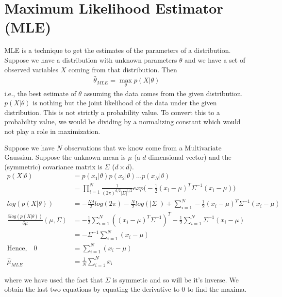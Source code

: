 \documentclass[../../statistical_learning_notes.tex]{subfiles}
\begin{document}
\section{Maximum Likelihood Estimator (MLE)}
MLE is a technique to get the estimates of the parameters of a distribution. Suppose we have a distribution with unknown parameters $\theta$ and we have a set of observed variables $X$ coming from that distribution. Then
\begin{align*}
    \hat{\theta}_{MLE} = \max_{\theta}p(X|\theta)
\end{align*}
i.e., the best estimate of $\theta$ assuming the data comes from the given distribution. $p(X|\theta)$ is nothing but the joint likelihood of the data under the given distribution. This is not strictly a probability value. To convert this to a probability value, we would be dividing by a normalizing constant which would not play a role in maximization.\newline

Suppose we have $N$ observations that we know come from a Multivariate Gaussian. Suppose the unknown mean is $\mu$ (a $d$ dimensional vector) and the (symmetric) covariance matrix is $\Sigma$ ($d \times d$).
\begin{align*}
    p(X|\theta) &= p(x_{1}|\theta)p(x_{2}|\theta) \ldots p(x_{N}|\theta)\\
    &= \prod_{i=1}^{N}\frac{1}{(2\pi)^{d/2} \lvert \Sigma \rvert^{1/2}} exp \bigg(-\frac{1}{2}(x_{i} - \mu)^{T}\Sigma^{-1}(x_{i} - \mu) \bigg)\\
    log(p(X|\theta)) &= -\frac{Nd}{2}log(2\pi) - \frac{N}{2}log(\lvert \Sigma \rvert) + \sum_{i=1}^{N}-\frac{1}{2}(x_{i} - \mu)^{T}\Sigma^{-1}(x_{i} - \mu)\\
    \frac{\partial log(p(X|\theta))}{\partial \mu}(\mu, \Sigma) &= -\frac{1}{2}\sum_{i=1}^{N} ((x_{i} - \mu)^{T}\Sigma^{-1})^{T} - \frac{1}{2}\sum_{i=1}^{N} \Sigma^{-1}(x_{i} - \mu)\\
    &= -\Sigma^{-1}\sum_{i=1}^{N} (x_{i} - \mu)\\
    \text{Hence,} \quad 0 &= \sum_{i=1}^{N} (x_{i} - \mu)\\
    \hat{\mu}_{MLE} &= \frac{1}{N}\sum_{i=1}^{N} x_{i}
\end{align*}

where we have used the fact that $\Sigma$ is symmetic and so will be it's inverse. We obtain the last two equations by equating the derivative to $0$ to find the maxima.
\end{document}
